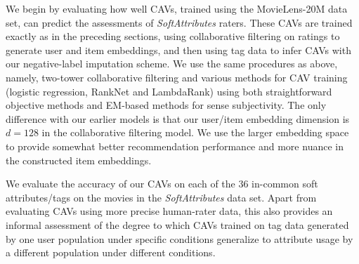 \documentclass[manuscript,screen,nonacm]{acmart}
\newcommand{\1}{{\mathbf 1}}
\theoremstyle{TheoremNum}
\begin{document}
We begin by evaluating how well CAVs, trained using the MovieLens-20M data set, can predict the assessments of \emph{SoftAttributes} raters. These CAVs are trained exactly as in the preceding sections, using collaborative filtering on ratings to generate user and item embeddings, and then using tag data to infer CAVs with our negative-label imputation scheme. We use the same procedures as above, namely, two-tower collaborative filtering and various methods for CAV training (logistic regression, RankNet and LambdaRank) using both straightforward objective methods and EM-based methods for sense subjectivity. The only difference with our earlier models is that our user/item embedding dimension is $d = 128$ in the collaborative filtering model. We use the larger embedding space to provide somewhat better recommendation performance and more nuance in the constructed item embeddings.


We evaluate the accuracy of our CAVs on each of the 36 in-common soft attributes/tags on the movies in the \emph{SoftAttributes} data set. Apart from evaluating CAVs using more precise human-rater data, this also provides an informal assessment of the degree to which CAVs trained on tag data generated by one user population under specific conditions generalize to attribute usage by a different population under different conditions.
\end{document}
